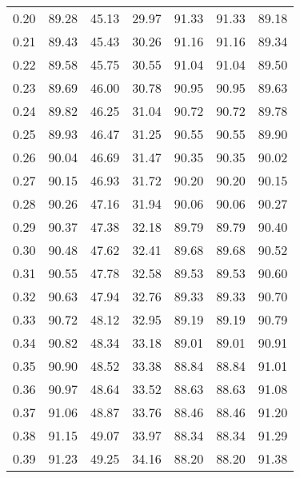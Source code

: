 \begin{tabular}{|c|c|c|c|c|c|c|}
      0.20 &     89.28 &     45.13 &      29.97 &   91.33 &      91.33 &         89.18 \\
      0.21 &     89.43 &     45.43 &      30.26 &   91.16 &      91.16 &         89.34 \\
      0.22 &     89.58 &     45.75 &      30.55 &   91.04 &      91.04 &         89.50 \\
      0.23 &     89.69 &     46.00 &      30.78 &   90.95 &      90.95 &         89.63 \\
      0.24 &     89.82 &     46.25 &      31.04 &   90.72 &      90.72 &         89.78 \\
      0.25 &     89.93 &     46.47 &      31.25 &   90.55 &      90.55 &         89.90 \\
      0.26 &     90.04 &     46.69 &      31.47 &   90.35 &      90.35 &         90.02 \\
      0.27 &     90.15 &     46.93 &      31.72 &   90.20 &      90.20 &         90.15 \\
      0.28 &     90.26 &     47.16 &      31.94 &   90.06 &      90.06 &         90.27 \\
      0.29 &     90.37 &     47.38 &      32.18 &   89.79 &      89.79 &         90.40 \\
      0.30 &     90.48 &     47.62 &      32.41 &   89.68 &      89.68 &         90.52 \\
      0.31 &     90.55 &     47.78 &      32.58 &   89.53 &      89.53 &         90.60 \\
      0.32 &     90.63 &     47.94 &      32.76 &   89.33 &      89.33 &         90.70 \\
      0.33 &     90.72 &     48.12 &      32.95 &   89.19 &      89.19 &         90.79 \\
      0.34 &     90.82 &     48.34 &      33.18 &   89.01 &      89.01 &         90.91 \\
      0.35 &     90.90 &     48.52 &      33.38 &   88.84 &      88.84 &         91.01 \\
      0.36 &     90.97 &     48.64 &      33.52 &   88.63 &      88.63 &         91.08 \\
      0.37 &     91.06 &     48.87 &      33.76 &   88.46 &      88.46 &         91.20 \\
      0.38 &     91.15 &     49.07 &      33.97 &   88.34 &      88.34 &         91.29 \\
      0.39 &     91.23 &     49.25 &      34.16 &   88.20 &      88.20 &         91.38 \\

\end{tabular}
